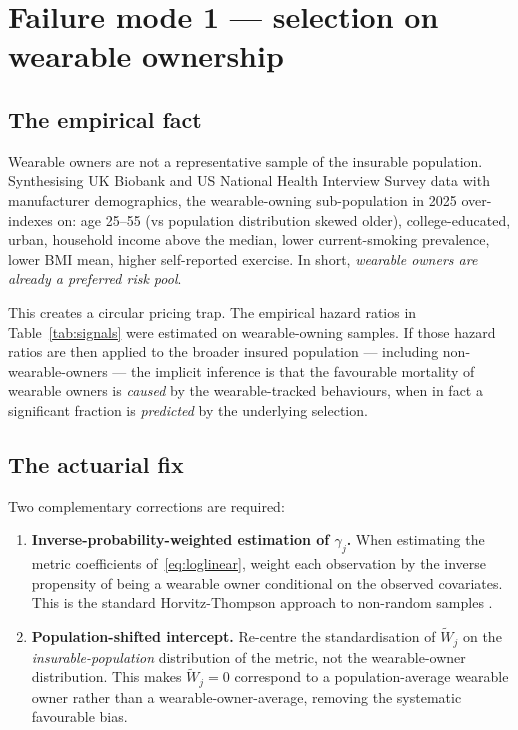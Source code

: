 \section{Failure mode 1 --- selection on wearable ownership}\label{sec:selection}

\subsection{The empirical fact}\label{ss:sel-fact}

Wearable owners are not a representative sample of the insurable
population. Synthesising UK Biobank and US National Health Interview
Survey data with manufacturer demographics, the wearable-owning
sub-population in 2025 over-indexes on: age 25--55 (vs population
distribution skewed older), college-educated, urban, household income
above the median, lower current-smoking prevalence, lower BMI mean,
higher self-reported exercise. In short, \emph{wearable owners are
already a preferred risk pool}.

This creates a circular pricing trap. The empirical hazard ratios in
Table~\ref{tab:signals} were estimated on wearable-owning samples. If
those hazard ratios are then applied to the broader insured
population --- including non-wearable-owners --- the implicit
inference is that the favourable mortality of wearable owners is
\emph{caused} by the wearable-tracked behaviours, when in fact a
significant fraction is \emph{predicted} by the underlying selection.

\subsection{The actuarial fix}\label{ss:sel-fix}

Two complementary corrections are required:

\begin{enumerate}[leftmargin=*,nosep,topsep=4pt]
   \item \textbf{Inverse-probability-weighted estimation of $\gamma_j$.}
         When estimating the metric coefficients of~\eqref{eq:loglinear},
         weight each observation by the inverse propensity of being a
         wearable owner conditional on the observed covariates. This
         is the standard Horvitz-Thompson approach to non-random
         samples \citep{HorvitzThompson1952}.
   \item \textbf{Population-shifted intercept.} Re-centre the
         standardisation of $\tilde W_j$ on the
         \emph{insurable-population} distribution of the metric, not
         the wearable-owner distribution. This makes
         $\tilde W_j=0$ correspond to a population-average wearable
         owner rather than a wearable-owner-average, removing the
         systematic favourable bias.
\end{enumerate}

